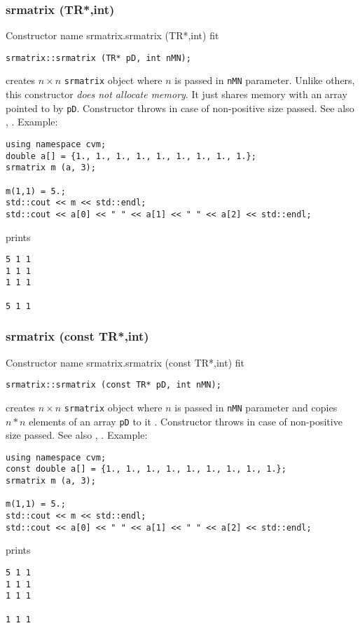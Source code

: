 \subsubsection{srmatrix (TR*,int)}
Constructor%
\pdfdest name {srmatrix.srmatrix (TR*,int)} fit
\begin{verbatim}
srmatrix::srmatrix (TR* pD, int nMN);
\end{verbatim}
creates  $n\times n$ \verb"srmatrix" object where $n$ is passed in
\verb"nMN" parameter.
Unlike others, this constructor \textit{does not allocate  memory}.
It just shares  memory with an array pointed to by \verb"pD".
Constructor throws  
in case of non-positive size passed.
See also , 
.
Example:
\begin{Verbatim}
using namespace cvm;
double a[] = {1., 1., 1., 1., 1., 1., 1., 1., 1.};
srmatrix m (a, 3);

m(1,1) = 5.;
std::cout << m << std::endl;
std::cout << a[0] << " " << a[1] << " " << a[2] << std::endl;
\end{Verbatim}
prints
\begin{Verbatim}
5 1 1
1 1 1
1 1 1

5 1 1
\end{Verbatim}
\newpage


\subsubsection{srmatrix (const TR*,int)}
Constructor%
\pdfdest name {srmatrix.srmatrix (const TR*,int)} fit
\begin{verbatim}
srmatrix::srmatrix (const TR* pD, int nMN);
\end{verbatim}
creates  $n\times n$ \verb"srmatrix" object where $n$ is passed in
\verb"nMN" parameter
and copies $n*n$ elements of an array  \verb"pD" to it .
Constructor throws  
in case of non-positive size passed.
See also , 
.
Example:
\begin{Verbatim}
using namespace cvm;
const double a[] = {1., 1., 1., 1., 1., 1., 1., 1., 1.};
srmatrix m (a, 3);

m(1,1) = 5.;
std::cout << m << std::endl;
std::cout << a[0] << " " << a[1] << " " << a[2] << std::endl;
\end{Verbatim}
prints
\begin{Verbatim}
5 1 1
1 1 1
1 1 1

1 1 1
\end{Verbatim}
\newpage





